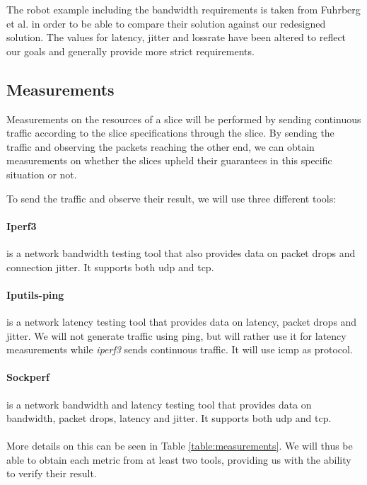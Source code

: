 The robot example including the \gls{bandwidth} requirements is taken from Fuhrberg et al. \cite{SE4} in order to be able to compare their solution against our redesigned solution. The values for \gls{latency}, \gls{jitter} and \gls{lossrate} have been altered to reflect our goals and generally provide more strict requirements.

\subsection{Measurements}
\label{measurements}
Measurements on the resources of a slice will be performed by sending continuous traffic according to the slice specifications through the slice. By sending the traffic and observing the packets reaching the other end, we can obtain measurements on whether the slices upheld their guarantees in this specific situation or not.

To send the traffic and observe their result, we will use three different tools:

\paragraph{Iperf3} \cite{iperf3} is a network \gls{bandwidth} testing tool that also provides data on packet drops and connection \gls{jitter}. It supports both \acrshort{udp} and \acrshort{tcp}.

\paragraph{Iputils-ping} \cite{iputils} is a network \gls{latency} testing tool that provides data on \gls{latency}, packet drops and \gls{jitter}. We will not generate traffic using ping, but will rather use it for \gls{latency} measurements while \textit{iperf3} sends continuous traffic. It will use \acrshort{icmp} as protocol.

\paragraph{Sockperf} \cite{sockperf} is a network \gls{bandwidth} and \gls{latency} testing tool that provides data on \gls{bandwidth}, packet drops, \gls{latency} and \gls{jitter}. It supports both \acrshort{udp} and \acrshort{tcp}.

\paragraph{} More details on this can be seen in Table \ref{table:measurements}. We will thus be able to obtain each metric from at least two tools, providing us with the ability to verify their result.

